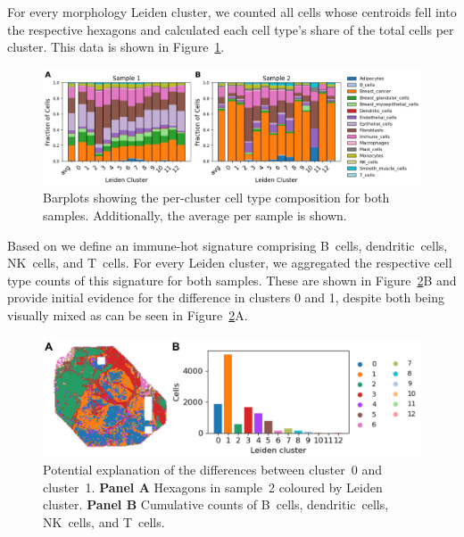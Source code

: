 \documentclass{article}
\begin{document}
For every morphology Leiden cluster, we counted all cells whose centroids fell into the respective hexagons and calculated each cell type's share of the total cells per cluster. This data is shown in Figure~\ref{fig:spatial_composition}.

\begin{figure}[htbp!]
\centering
\includegraphics[width=.95\linewidth]{./figs/fig_S3_spatial_composition.png}
\caption{\label{fig:spatial_composition}{}Barplots showing the per-cluster cell type composition for both samples. Additionally, the average per sample is shown.}
\end{figure}

\newpage

Based on \citep{Wu2024-zp} we define an immune-hot signature comprising B~cells, dendritic~cells, NK~cells, and T~cells. For every Leiden cluster, we aggregated the respective cell type counts of this signature for both samples. These are shown in Figure~\ref{fig:spatial_immunehot}B and provide initial evidence for the difference in clusters 0 and 1, despite both being visually mixed as can be seen in Figure~\ref{fig:spatial_immunehot}A.

\begin{figure}[htbp!]
\centering
\includegraphics[width=.85\linewidth]{./figs/fig_S5_immunehot.png}
\caption{\label{fig:spatial_immunehot}{}Potential explanation of the differences between cluster~0 and cluster~1. \textbf{Panel A} Hexagons in sample~2 coloured by Leiden cluster. \textbf{Panel B} Cumulative counts of B~cells, dendritic~cells, NK~cells, and T~cells.}
\end{figure}
\end{document}
